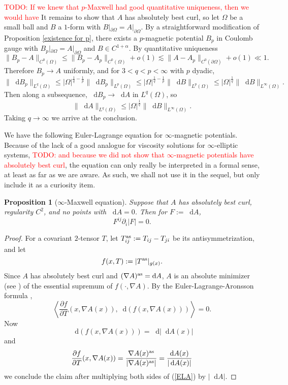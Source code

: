 \documentclass[reqno,11pt]{amsart}
\newcommand*\dif{\mathop{}\!\mathrm{d}}
\newtheorem{proposition}[theorem]{Proposition}
\theoremstyle{definition}
\numberwithin{equation}{section}
\newcommand\todo[1]{\textcolor{red}{TODO: #1}}
\begin{document}
\todo{If we knew that $p$-Maxwell had good quantitative uniqueness, then we would have}
It remains to show that $A$ has absolutely best curl, so let $\Omega$ be a small ball and $B$ a $1$-form with $B|_{\partial \Omega} = A|_{\partial \Omega}$.
By a straightforward modification of Proposition \ref{existence for p}, there exists a $p$-magnetic potential $B_p$ in Coulomb gauge with $B_p|_{\partial \Omega} = A|_{\partial \Omega}$ and $B \in C^{1 + \alpha}$.
By quantitative uniqueness
$$\|B_p - A\|_{C^0(\Omega)} \leq \|B_p - A_p\|_{C^0(\Omega)} + o(1) \lesssim \|A - A_p\|_{C^0(\partial \Omega)} + o(1) \ll 1.$$
Therefore $B_p \to A$ uniformly, and for $3 < q < p < \infty$ with $p$ dyadic,
$$\|\dif B_p\|_{L^q(\Omega)} \leq |\Omega|^{\frac{1}{q} -\frac{1}{p}} \|\dif B_p\|_{L^p(\Omega)} \leq |\Omega|^{\frac{1}{q} -\frac{1}{p}} \|\dif B\|_{L^p(\Omega)} \leq |\Omega|^{\frac{1}{q}} \|\dif B\|_{L^\infty(\Omega)}.$$
Then along a subsequence, $\dif B_p \to \dif A$ in $L^q(\Omega)$, so 
$$\|\dif A\|_{L^q(\Omega)} \leq |\Omega|^{\frac{1}{q}} \|\dif B\|_{L^\infty(\Omega)}.$$
Taking $q \to \infty$ we arrive at the conclusion.

We have the following Euler-Lagrange equation for $\infty$-magnetic potentials.
Because of the lack of a good analogue for viscosity solutions for $\infty$-elliptic systems, \todo{and because we did not show that $\infty$-magnetic potentials have absolutely best curl}, the equation can only really be interpreted in a formal sense, at least as far as we are aware.
As such, we shall not use it in the sequel, but only include it as a curiosity item.

\begin{proposition}[$\infty$-Maxwell equation]
Suppose that $A$ has absolutely best curl, regularity $C^2$, and no points with $\dif A = 0$. Then for $F := \dif A$,
\begin{equation}\label{infinityMaxwell}
	F^{ij} \partial_i |F| = 0.
\end{equation}
\end{proposition}
\begin{proof}
For a covariant $2$-tensor $T$, let $T^{\rm as}_{ij} := T_{ij} - T_{ji}$ be its antisymmetrization, and let
$$f(x, T) := |T^{\rm as}|_{g(x)}.$$
Since $A$ has absolutely best curl and $(\nabla A)^{\rm as} = \dif A$, $A$ is an absolute minimizer (see \cite[Definition 5.1]{Barron2001}) of the essential supremum of $f(\cdot, \nabla A)$.
By the Euler-Lagrange-Aronsson formula \cite[Theorem 5.2]{Barron2001},
\begin{equation}\label{ELA}
	\left\langle \frac{\partial f}{\partial T}(x, \nabla A(x)), \dif (f(x, \nabla A(x))) \right\rangle = 0.
\end{equation}
Now
$$\dif(f(x, \nabla A(x))) = \dif |\dif A(x)|$$
and 
$$\frac{\partial f}{\partial T}(x, \nabla A(x)) = \frac{\nabla A(x)^{\rm as}}{|\nabla A(x)^{\rm as}|} = \frac{\dif A(x)}{|\dif A(x)|}$$
we conclude the claim after multiplying both sides of (\ref{ELA}) by $|\dif A|$.
\end{proof}
\end{document}
